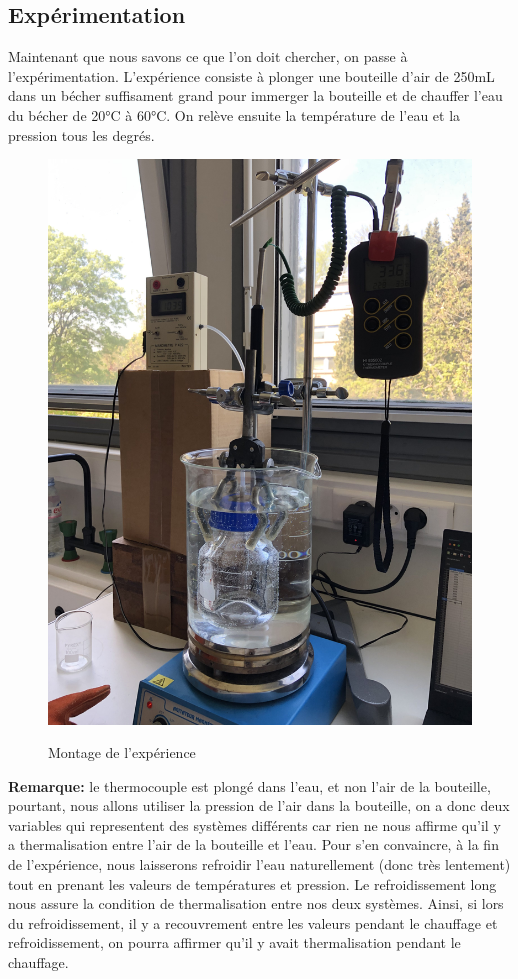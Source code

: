 \documentclass[12pt]{article}
\begin{document}
\subsection{Expérimentation}
Maintenant que nous savons ce que l'on doit chercher, on passe à l'expérimentation. L'expérience consiste à
plonger une bouteille d'air de 250mL dans un bécher suffisament grand pour immerger la bouteille et de chauffer l'eau du bécher de 20°C à 60°C.
On relève ensuite la température de l'eau et la pression tous les degrés.

\begin{figure}[!h]
	\begin{center}
		\includegraphics[scale=0.07]{img/exp2.jpg}
		\label{Exp2}
		\caption{Montage de l'expérience}
	\end{center}
\end{figure}

\newpage
\textbf{Remarque:} le thermocouple est plongé dans l'eau, et non l'air de la bouteille, pourtant, nous allons utiliser la pression de l'air dans
la bouteille, on a donc deux variables qui representent des systèmes différents car rien ne nous affirme qu'il y a thermalisation entre l'air de la bouteille et l'eau.
Pour s'en convaincre, à la fin de l'expérience, nous laisserons refroidir l'eau naturellement (donc très lentement) tout en prenant les valeurs de températures et pression. 
Le refroidissement long nous assure la condition de thermalisation entre nos deux systèmes. Ainsi, si lors du refroidissement, il y a recouvrement entre les valeurs pendant le chauffage et 
refroidissement, on pourra affirmer qu'il y avait thermalisation pendant le chauffage.
\end{document}
